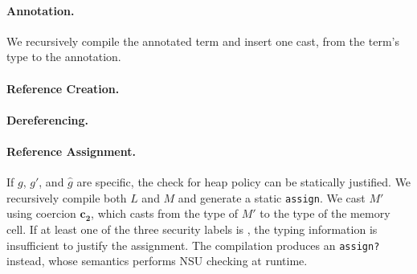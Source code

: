 \paragraph{Annotation.}
We recursively compile the annotated term and insert one cast, from the term's
type to the annotation.

\paragraph{Reference Creation.}

\paragraph{Dereferencing.}

\paragraph{Reference Assignment.} If $g$, $g'$, and $\hat{g}$ are
specific, the check for heap policy can be statically justified. We recursively
compile both $L$ and $M$ and generate a static \texttt{assign}. We cast $M'$
using coercion $\bm{c_2}$, which casts from the type of $M'$ to the type of the
memory cell. If at least one of the three security labels is \unk, the typing
information is insufficient to justify the assignment. The compilation produces
an \texttt{assign?} instead, whose semantics performs NSU checking at runtime.
